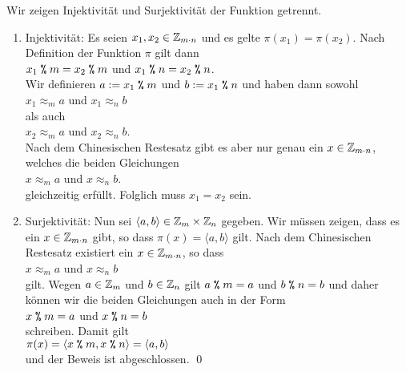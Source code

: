 \proof
Wir zeigen Injektivität
und Surjektivität der Funktion getrennt.
\begin{enumerate}
\item Injektivität:  Es seien $x_1,x_2 \in \mathbb{Z}_{m \cdot n}$ und es gelte $\pi(x_1) = \pi(x_2)$.  Nach
      Definition der Funktion $\pi$ gilt dann
      \\[0.2cm]
      \hspace*{1.3cm}
      $x_1 \;\texttt{\%}\; m = x_2 \;\texttt{\%}\; m$ \quad und \quad 
      $x_1 \;\texttt{\%}\; n = x_2 \;\texttt{\%}\; n$.
      \\[0.2cm]
      Wir definieren $a := x_1 \;\texttt{\%}\; m$ und $b := x_1 \;\texttt{\%}\; n$ und haben dann sowohl
      \\[0.2cm]
      \hspace*{1.3cm}
      $x_1 \approx_m a$ \quad und \quad $x_1 \approx_n b$
      \\[0.2cm]
      als auch
      \\[0.2cm]
      \hspace*{1.3cm}
      $x_2 \approx_m a$ \quad und \quad $x_2 \approx_n b$.
      \\[0.2cm]
      Nach dem Chinesischen Restesatz
      gibt es aber nur genau ein $x \in \mathbb{Z}_{m \cdot n}$, welches die beiden Gleichungen
      \\[0.2cm]
      \hspace*{1.3cm}
      $x \approx_m a$ \quad und \quad $x \approx_n b$.
      \\[0.2cm]
      gleichzeitig erfüllt.  Folglich muss $x_1 = x_2$ sein.
\item Surjektivität: Nun sei $\langle a, b \rangle \in \mathbb{Z}_{m} \times \mathbb{Z}_{n}$ gegeben.  Wir müssen
      zeigen, dass es ein $x \in \mathbb{Z}_{m \cdot n}$ gibt, so dass $\pi(x) = \langle a, b \rangle$
      gilt.  Nach dem Chinesischen Restesatz existiert ein $x \in \mathbb{Z}_{m \cdot n}$, so dass
      \\[-0.2cm]
      \hspace*{1.3cm}
      $x \approx_m a$ \quad und \quad $x \approx_n b$
      \\[0.2cm]
      gilt.  Wegen $a \in \mathbb{Z}_{m}$ und $b \in \mathbb{Z}_{n}$ gilt $a \;\texttt{\%}\; m = a$ und $b \;\texttt{\%}\; n = b$
      und daher können wir die beiden Gleichungen auch 
      in der Form
      \\[0.2cm]
      \hspace*{1.3cm}
      $x \;\texttt{\%}\; m = a$ \quad und \quad $x \;\texttt{\%}\; n = b$
      \\[0.2cm]
      schreiben.  Damit gilt
      \\[0.2cm]
      \hspace*{1.3cm}
      $\pi(x) = \langle x \;\texttt{\%}\; m, x \;\texttt{\%}\; n \rangle = \langle a, b \rangle$
      \\[0.2cm]
      und der Beweis ist abgeschlossen.  \qed
\end{enumerate}

